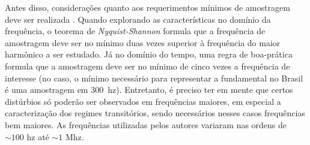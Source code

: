 Antes disso, considerações quanto aos requerimentos mínimos de
amostragem deve ser realizada \cite{nilm_matthews_overview_2008_22}.
Quando explorando as características no domínio da frequência, o
teorema de \emph{Nyquist-Shannon} formula que a frequência de
amostragem deve ser no mínimo duas vezes superior à frequência do
maior harmônico a ser estudado. Já no domínio do tempo, uma regra de
boa-prática \cite{nilm_matthews_overview_2008_22} formula que a
amostragem deve ser no mínimo de cinco vezes a frequência de interesse
(no caso, o mínimo necessário para representar a fundamental no Brasil é
uma amostragem em 300~\acs{hz}). Entretanto, é preciso ter em
mente que certos distúrbios só poderão ser observados em frequências
maiores, em especial a caracterização dos regimes transitórios, sendo
necessários nesses casos frequências bem maiores. As frequências
utilizadas pelos autores variaram nas ordens de $\sim100$ \acs{hz} até
$\sim1$ M\acs{hz}.

